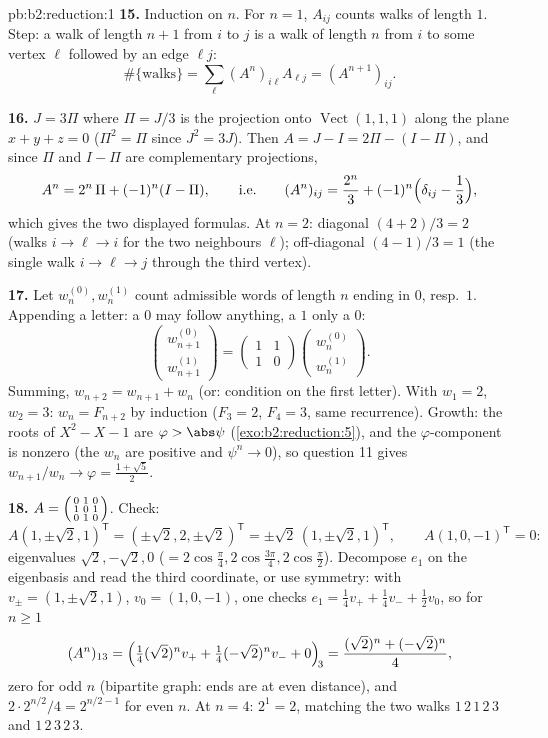\begin{solution}{pb:b2:reduction:1}
\textbf{15.} Induction on $n$. For $n = 1$, $A_{ij}$ counts
walks of length $1$. Step: a walk of length $n + 1$ from $i$ to
$j$ is a walk of length $n$ from $i$ to some vertex $\ell$
followed by an edge $\ell j$:
\[
\#\{\text{walks}\} = \sum_{\ell} (A^n)_{i\ell}A_{\ell j} =
(A^{n+1})_{ij}.
\]

\textbf{16.} $J = 3\Pi$ where $\Pi = J/3$ is the projection onto
$\operatorname{Vect}(1,1,1)$ along the plane $x + y + z = 0$
($\Pi^2 = \Pi$ since $J^2 = 3J$). Then $A = J - I = 2\Pi - (I -
\Pi)$, and since $\Pi$ and $I - \Pi$ are complementary
projections,
\[
A^n = 2^n\,\Pi + (-1)^n (I - \Pi),
\qquad\text{i.e.}\qquad
(A^n)_{ij} = \frac{2^n}3 + (-1)^n\Bigl(\delta_{ij} -
\frac13\Bigr),
\]
which gives the two displayed formulas. At $n = 2$: diagonal
$(4 + 2)/3 = 2$ (walks $i \to \ell \to i$ for the two neighbours
$\ell$); off-diagonal $(4 - 1)/3 = 1$ (the single walk $i \to
\ell \to j$ through the third vertex).

\textbf{17.} Let $w_n^{(0)}, w_n^{(1)}$ count admissible words of
length $n$ ending in $0$, resp.\ $1$. Appending a letter: a $0$
may follow anything, a $1$ only a $0$:
\[
\begin{pmatrix} w_{n+1}^{(0)}\\ w_{n+1}^{(1)}\end{pmatrix}
= \begin{pmatrix} 1 & 1\\ 1 & 0\end{pmatrix}
\begin{pmatrix} w_n^{(0)}\\ w_n^{(1)}\end{pmatrix}.
\]
Summing, $w_{n+2} = w_{n+1} + w_n$ (or: condition on the first
letter). With $w_1 = 2$, $w_2 = 3$: $w_n = F_{n+2}$ by induction
($F_3 = 2$, $F_4 = 3$, same recurrence). Growth: the roots of
$X^2 - X - 1$ are $\varphi > \abs\psi$
(\cref{exo:b2:reduction:5}), and the $\varphi$-component is
nonzero (the $w_n$ are positive and $\psi^n \to 0$), so question
11 gives $w_{n+1}/w_n \to \varphi = \frac{1 + \sqrt5}2$.

\textbf{18.} $A = \begin{psmallmatrix} 0&1&0\\ 1&0&1\\
0&1&0\end{psmallmatrix}$. Check:
\[
A(1, \pm\sqrt2, 1)^{\mathsf T}
= (\pm\sqrt2, 2, \pm\sqrt2)^{\mathsf T}
= \pm\sqrt2\,(1, \pm\sqrt2, 1)^{\mathsf T},
\qquad
A(1, 0, -1)^{\mathsf T} = 0 :
\]
eigenvalues $\sqrt2, -\sqrt2, 0$ ($= 2\cos\frac\pi4,
2\cos\frac{3\pi}4, 2\cos\frac\pi2$). Decompose $e_1$ on the
eigenbasis and read the third coordinate, or use symmetry: with
$v_\pm = (1, \pm\sqrt2, 1)$, $v_0 = (1, 0, -1)$, one checks $e_1
= \frac14 v_+ + \frac14 v_- + \frac12 v_0$, so for $n \geq 1$
\[
(A^n)_{13} = \Bigl(\tfrac14(\sqrt2)^n v_+ +
\tfrac14(-\sqrt2)^n v_- + 0\Bigr)_{\!3}
= \frac{(\sqrt2)^n + (-\sqrt2)^n}{4},
\]
zero for odd $n$ (bipartite graph: ends are at even distance),
and $2\cdot 2^{n/2}/4 = 2^{n/2 - 1}$ for even $n$. At $n = 4$:
$2^{1} = 2$, matching the two walks $1\,2\,1\,2\,3$ and
$1\,2\,3\,2\,3$.


\end{solution}
